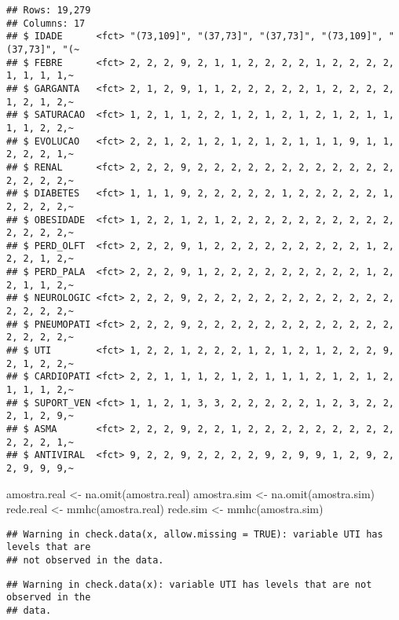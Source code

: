 \documentclass[
]{article}
\newenvironment{Shaded}{\begin{snugshade}}{\end{snugshade}}
\newcommand{\FunctionTok}[1]{\textcolor[rgb]{0.00,0.00,0.00}{#1}}
\newcommand{\NormalTok}[1]{#1}
\newcommand{\OtherTok}[1]{\textcolor[rgb]{0.56,0.35,0.01}{#1}}
\begin{document}
\begin{verbatim}
## Rows: 19,279
## Columns: 17
## $ IDADE      <fct> "(73,109]", "(37,73]", "(37,73]", "(73,109]", "(37,73]", "(~
## $ FEBRE      <fct> 2, 2, 2, 9, 2, 1, 1, 2, 2, 2, 2, 1, 2, 2, 2, 2, 1, 1, 1, 1,~
## $ GARGANTA   <fct> 2, 1, 2, 9, 1, 1, 2, 2, 2, 2, 2, 1, 2, 2, 2, 2, 1, 2, 1, 2,~
## $ SATURACAO  <fct> 1, 2, 1, 1, 2, 2, 1, 2, 1, 2, 1, 2, 1, 2, 1, 1, 1, 1, 2, 2,~
## $ EVOLUCAO   <fct> 2, 2, 1, 2, 1, 2, 1, 2, 1, 2, 1, 1, 1, 9, 1, 1, 2, 2, 2, 1,~
## $ RENAL      <fct> 2, 2, 2, 9, 2, 2, 2, 2, 2, 2, 2, 2, 2, 2, 2, 2, 2, 2, 2, 2,~
## $ DIABETES   <fct> 1, 1, 1, 9, 2, 2, 2, 2, 2, 1, 2, 2, 2, 2, 2, 1, 2, 2, 2, 2,~
## $ OBESIDADE  <fct> 1, 2, 2, 1, 2, 1, 2, 2, 2, 2, 2, 2, 2, 2, 2, 2, 2, 2, 2, 2,~
## $ PERD_OLFT  <fct> 2, 2, 2, 9, 1, 2, 2, 2, 2, 2, 2, 2, 2, 2, 1, 2, 2, 2, 1, 2,~
## $ PERD_PALA  <fct> 2, 2, 2, 9, 1, 2, 2, 2, 2, 2, 2, 2, 2, 2, 1, 2, 2, 1, 1, 2,~
## $ NEUROLOGIC <fct> 2, 2, 2, 9, 2, 2, 2, 2, 2, 2, 2, 2, 2, 2, 2, 2, 2, 2, 2, 2,~
## $ PNEUMOPATI <fct> 2, 2, 2, 9, 2, 2, 2, 2, 2, 2, 2, 2, 2, 2, 2, 2, 2, 2, 2, 2,~
## $ UTI        <fct> 1, 2, 2, 1, 2, 2, 2, 1, 2, 1, 2, 1, 2, 2, 2, 9, 2, 1, 2, 2,~
## $ CARDIOPATI <fct> 2, 2, 1, 1, 1, 2, 1, 2, 1, 1, 1, 2, 1, 2, 1, 2, 1, 1, 1, 2,~
## $ SUPORT_VEN <fct> 1, 1, 2, 1, 3, 3, 2, 2, 2, 2, 2, 1, 2, 3, 2, 2, 2, 1, 2, 9,~
## $ ASMA       <fct> 2, 2, 2, 9, 2, 2, 1, 2, 2, 2, 2, 2, 2, 2, 2, 2, 2, 2, 2, 1,~
## $ ANTIVIRAL  <fct> 9, 2, 2, 9, 2, 2, 2, 2, 9, 2, 9, 9, 1, 2, 9, 2, 2, 9, 9, 9,~
\end{verbatim}

\begin{Shaded}
\begin{Highlighting}[]
\NormalTok{amostra.real }\OtherTok{\textless{}{-}} \FunctionTok{na.omit}\NormalTok{(amostra.real)}
\NormalTok{amostra.sim }\OtherTok{\textless{}{-}} \FunctionTok{na.omit}\NormalTok{(amostra.sim)}
\NormalTok{rede.real }\OtherTok{\textless{}{-}} \FunctionTok{mmhc}\NormalTok{(amostra.real)}
\NormalTok{rede.sim }\OtherTok{\textless{}{-}} \FunctionTok{mmhc}\NormalTok{(amostra.sim)}
\end{Highlighting}
\end{Shaded}

\begin{verbatim}
## Warning in check.data(x, allow.missing = TRUE): variable UTI has levels that are
## not observed in the data.
\end{verbatim}

\begin{verbatim}
## Warning in check.data(x): variable UTI has levels that are not observed in the
## data.
\end{verbatim}
\end{document}
